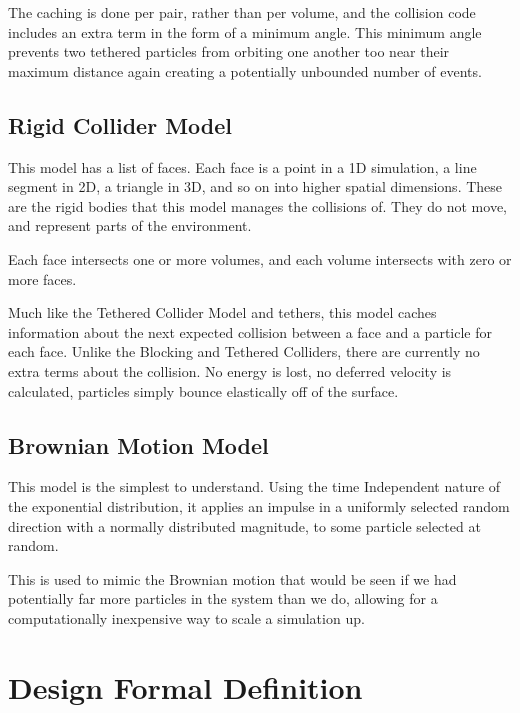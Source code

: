 \documentclass[conference]{IEEEtran}
\begin{document}
The caching is done per pair, rather than per volume, and the collision code includes an extra term in the form of a minimum angle. This minimum angle prevents two tethered particles from orbiting one another too near their maximum distance again creating a potentially unbounded number of events.

\subsection{Rigid Collider Model}
This model has a list of faces. Each face is a point in a 1D simulation, a line segment in 2D, a triangle in 3D, and so on into higher spatial dimensions. These are the rigid bodies that this model manages the collisions of. They do not move, and represent parts of the environment.

Each face intersects one or more volumes, and each volume intersects with zero or more faces.

Much like the Tethered Collider Model and tethers, this model caches information about the next expected collision between a face and a particle for each face. Unlike the Blocking and Tethered Colliders, there are currently no extra terms about the collision. No energy is lost, no deferred velocity is calculated, particles simply bounce elastically off of the surface.

\subsection{Brownian Motion Model}
This model is the simplest to understand. Using the time Independent nature of the exponential distribution, it applies an impulse in a uniformly selected random direction with a normally distributed magnitude, to some particle selected at random. 

This is used to mimic the Brownian motion that would be seen if we had potentially far more particles in the system than we do, allowing for a computationally inexpensive way to scale a simulation up.

\section{Design Formal Definition}
\end{document}
